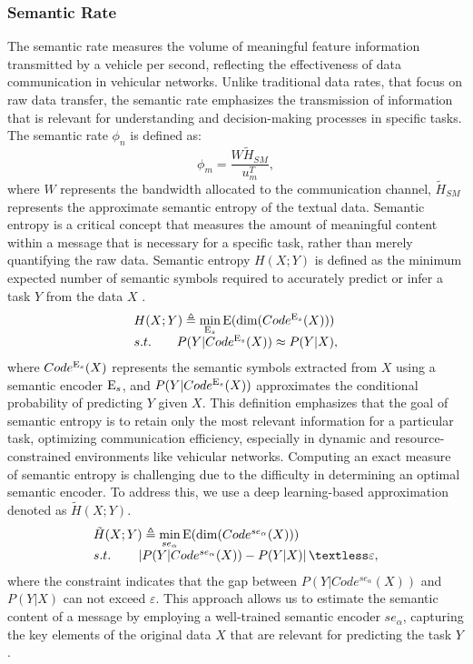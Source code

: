 \documentclass[10pt, lettersize,journal]{IEEEtran}
\begin{document}
	\subsubsection{Semantic Rate}
	The semantic rate measures the volume of meaningful feature information transmitted by a vehicle per second, reflecting the effectiveness of data communication in vehicular networks. Unlike traditional data rates, that focus on raw data transfer, the semantic rate emphasizes the transmission of information that is relevant for understanding and decision-making processes in specific tasks. 
	The semantic rate ${\phi _n}$ is defined as:
	\begin{equation}\label{eq66}
		{\phi _m} = \frac{{W{{\tilde H}_{SM}}}}{{u_m^T}},
	\end{equation}
	where $W$ represents the bandwidth allocated to the communication channel, ${{{\tilde H}_{SM}}}$ represents the approximate semantic entropy of the textual data. 
	Semantic entropy is a critical concept that measures the amount of meaningful content within a message that is necessary for a specific task, rather than merely quantifying the raw data. Semantic entropy $H(X;Y)$ is defined as the minimum expected number of semantic symbols required to accurately predict or infer a task $Y$ from the data $X$ \cite{chattopadhyay2021quantifying}.
	\begin{equation}
		\begin{array}{l}
			H(X;Y) \triangleq \mathop {\min }\limits_{{{\rm E}_s}} {\rm E}(\dim (Cod{e^{{{\rm E}_s}}}(X)))\\
			s.t.\qquad{\rm{   }}P(Y|Cod{e^{{{\rm E}_s}}}(X)){\rm{ }} \approx P(Y|X),
		\end{array} 
	\end{equation}
	where $Cod{e^{{{\rm E}_s}}}(X)$ represents the semantic symbols extracted from $X$ using a semantic encoder ${{{\rm E}_s}}$, and $P(Y|Cod{e^{{{\rm E}_s}}}(X))$ approximates the conditional probability of predicting $Y$ given $X$. This definition emphasizes that the goal of semantic entropy is to retain only the most relevant information for a particular task, optimizing communication efficiency, especially in dynamic and resource-constrained environments like vehicular networks.
	Computing an exact measure of semantic entropy is challenging due to the difficulty in determining an optimal semantic encoder. To address this, we use a deep learning-based approximation denoted as $\tilde H(X;Y)$. 
	\begin{equation}
		\begin{array}{l}
			\tilde H(X;Y) \triangleq \mathop {\min }\limits_{s{e_\alpha }} {\rm E}(\dim (Cod{e^{s{e_\alpha }}}(X)))\\
			s.t.\qquad \left \lvert P(Y|Cod{e^{s{e_\alpha }}}(X)){\rm{ }} - P(Y|X) \right \lvert \textless \varepsilon,
		\end{array} 
	\end{equation}
	where the constraint indicates that the gap between $P(Y|Cod{e^{s{e_\alpha }}}(X))$ and $P(Y|X)$ can not exceed $\varepsilon$.
	This approach allows us to estimate the semantic content of a message by employing a well-trained semantic encoder ${s{e_\alpha }}$, capturing the key elements of the original data $X$ that are relevant for predicting the task $Y$.
	
\end{document}
